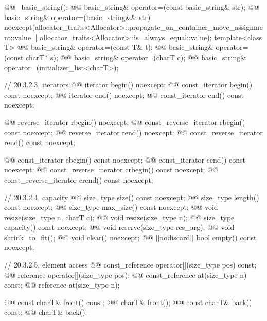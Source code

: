 \documentclass{wg21}
\begin{document}
\begin{codeblock}
{{    @@ ~basic_string();
    @@ basic_string& operator=(const basic_string& str);
    @@ basic_string& operator=(basic_string&& str)
      noexcept(allocator_traits<Allocator>::propagate_on_container_move_assignment::value ||
               allocator_traits<Allocator>::is_always_equal::value);
    template<class T>
      @@ basic_string& operator=(const T& t);
    @@ basic_string& operator=(const charT* s);
    @@ basic_string& operator=(charT c);
    @@ basic_string& operator=(initializer_list<charT>);

    // 20.3.2.3, iterators
    @@ iterator       begin() noexcept;
    @@ const_iterator begin() const noexcept;
    @@ iterator       end() noexcept;
    @@ const_iterator end() const noexcept;

    @@ reverse_iterator       rbegin() noexcept;
    @@ const_reverse_iterator rbegin() const noexcept;
    @@ reverse_iterator       rend() noexcept;
    @@ const_reverse_iterator rend() const noexcept;

    @@ const_iterator         cbegin() const noexcept;
    @@ const_iterator         cend() const noexcept;
    @@ const_reverse_iterator crbegin() const noexcept;
    @@ const_reverse_iterator crend() const noexcept;

    // 20.3.2.4, capacity
    @@ size_type size() const noexcept;
    @@ size_type length() const noexcept;
    @@ size_type max_size() const noexcept;
    @@ void resize(size_type n, charT c);
    @@ void resize(size_type n);
    @@ size_type capacity() const noexcept;
    @@ void reserve(size_type res_arg);
    @@ void shrink_to_fit();
    @@ void clear() noexcept;
    @@ [[nodiscard]] bool empty() const noexcept;

    // 20.3.2.5, element access
    @@ const_reference operator[](size_type pos) const;
    @@ reference       operator[](size_type pos);
    @@ const_reference at(size_type n) const;
    @@ reference       at(size_type n);

    @@ const charT& front() const;
    @@ charT&       front();
    @@ const charT& back() const;
    @@ charT&       back();

}}
\end{codeblock}
\end{document}
